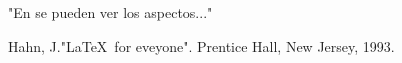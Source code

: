 \documentclass{book}
\begin{document}
	
"En \cite[pág. 80]{Hahn} se pueden ver los aspectos..."	

\begin{thebibliography}{99}
	
	 Hahn, J."\LaTeX \, for eveyone".
	Prentice Hall, New Jersey, 1993.
\end{thebibliography}
	
\end{document}
